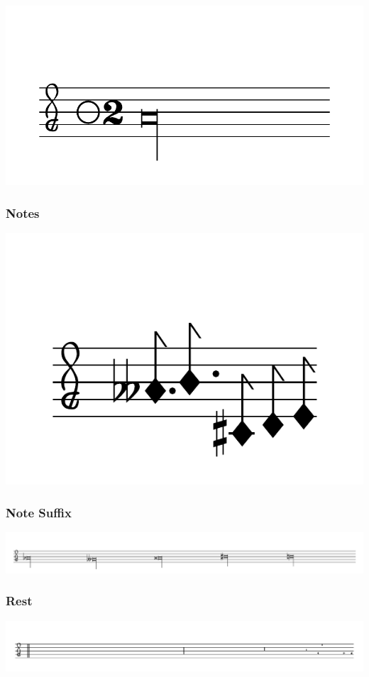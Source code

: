 \documentclass{article}
\begin{document}
        \includegraphics[scale=0.5]{figures_tests/pdf/smens/perfectmeter10.pdf}

    \subsubsection{Notes}
        \includegraphics[scale=0.5]{figures_tests/pdf/smens/note1.pdf}

    \subsubsection{Note Suffix}
        \includegraphics[scale=0.28]{figures_tests/pdf/smens/notesufix.pdf}

    \subsubsection{Rest}
        \includegraphics[scale=0.3]{figures_tests/pdf/smens/rest1.pdf}
\end{document}
